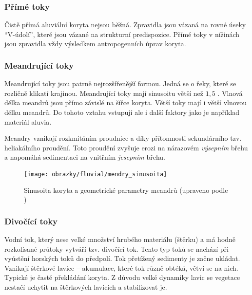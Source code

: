 \subsubsection{Přímé toky}
Čistě přímá aluviální koryta nejsou běžná. Zpravidla jsou vázaná na rovné úseky \enquote{V-údolí}, které jsou vázané na strukturní predispozice. Přímé toky v nížinách jsou zpravidla vždy výsledkem antropogenních úprav koryta. 

\subsubsection{Meandrující toky}
Meandrující toky jsou patrně nejrozšířenější formou. Jedná se o řeky, které se rozličně klikatí krajinou. Meandrující toky mají sinusoitu větší než $1,5$ \parencite{huggettFundamentalsGeomorphology2017}. Vlnová délka meandrů jsou přímo závislé na šířce koryta. Větší toky mají i větší vlnovou délku meandrů. Do tohoto vztahu vstupují ale i další faktory jako je například materiál aluvia. 

Meandry vznikají rozkmitáním proudnice a díky přítomnosti sekundárního tzv. heliakálního proudění. Toto proudění zvyšuje erozi na nárazovém \emph{výsepním} břehu a napomáhá sedimentaci na vnitřním \emph{jesepním} břehu. 

\begin{figure}
	\centering
	\texttt{[image: obrazky/fluvial/mendry\_sinusoita]}
	\caption{Sinusoita koryta a geometrické parametry meandrů (upraveno podle \textcite{biermanKeyConceptsGeomorphology2014})}
	\label{fig:mendrysinusoita}
\end{figure}

\subsubsection{Divočící toky}
Vodní tok, který nese velké množství hrubého materiálu (štěrku) a má hodně rozkolísané průtoky vytváří tzv. divočící tok. Tento typ toků se nachází při vyústění horských toků do předpolí. Tok přetížený sedimenty je začne ukládat. Vznikají štěrkové lavice -- akumulace, které tok různě obtéká, větví se na nich. Typické je časté překládání koryta. Z důvodu velké dynamiky lavic se vegetace nestačí uchytit na štěrkových lavicích a stabilizovat je.

